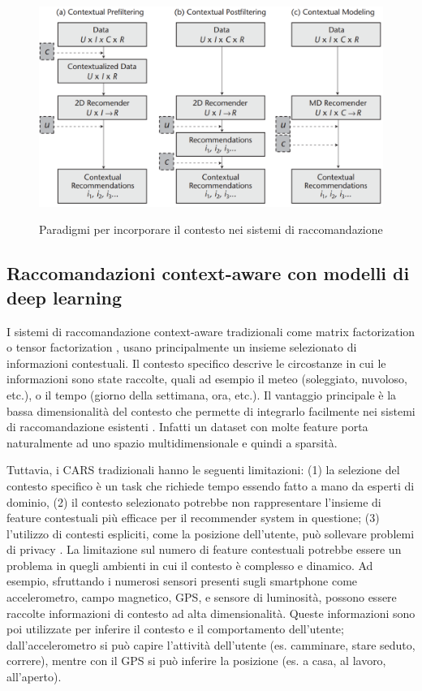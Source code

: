 \begin{figure}
  \centering
  \includegraphics[width=\linewidth]{immagini/paradigm_for_context_inclusion.png}
  \caption{Paradigmi per incorporare il contesto nei sistemi di raccomandazione}
  \cite{context-paradigm}
  \label{fig:context-paradigm}
\end{figure}

\subsection{Raccomandazioni context-aware con modelli di deep learning}
I sistemi di raccomandazione context-aware tradizionali come matrix factorization \cite{mf-context-aware} o tensor factorization \cite{tensor-context-aware}, usano principalmente un insieme selezionato di informazioni contestuali. Il contesto specifico descrive le circostanze in cui le informazioni sono state raccolte, quali ad esempio il meteo (soleggiato, nuvoloso, etc.), o il tempo (giorno della settimana, ora, etc.). Il vantaggio principale è la bassa dimensionalità del contesto che permette di integrarlo facilmente nei sistemi di raccomandazione esistenti \cite{context-aware-deep-learning}. Infatti un dataset con molte feature porta naturalmente ad uno spazio multidimensionale e quindi a sparsità.

Tuttavia, i CARS tradizionali  hanno le seguenti limitazioni: (1) la selezione del contesto specifico è un task che richiede tempo essendo fatto a mano da esperti di dominio, (2) il contesto selezionato potrebbe non rappresentare l'insieme di feature contestuali più efficace per il recommender system in questione; (3) l'utilizzo di contesti espliciti, come la posizione dell'utente, può sollevare problemi di privacy  \cite{context-aware-deep-learning}. La limitazione sul numero di feature contestuali potrebbe essere un problema in quegli ambienti in cui il contesto è complesso e dinamico. Ad esempio, sfruttando i numerosi sensori presenti sugli smartphone come accelerometro, campo magnetico, GPS, e sensore di luminosità, possono essere raccolte informazioni di contesto ad alta dimensionalità. Queste informazioni sono poi utilizzate per inferire il contesto e il comportamento dell'utente; dall'accelerometro si può capire l'attività dell'utente (es. camminare, stare seduto, correre), mentre con il GPS si può inferire la posizione (es. a casa, al lavoro, all'aperto).

